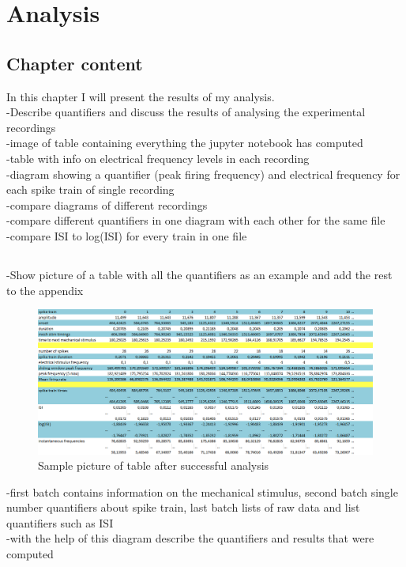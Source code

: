 \chapter{Analysis}

\section{Chapter content}
In this chapter I will present the results of my analysis.\\
-Describe quantifiers and discuss the results of analysing the experimental recordings\\
-image of table containing everything the jupyter notebook has computed\\
-table with info on electrical frequency levels in each recording\\
-diagram showing a quantifier (peak firing frequency) and electrical frequency for each spike train of single recording\\
-compare diagrams of different recordings\\
-compare different quantifiers in one diagram with each other for the same file\\
-compare ISI to log(ISI) for every train in one file\\

\section{}
-Show picture of a table with all the quantifiers as an example and add the rest to the appendix\\
\begin{figure}
	\includegraphics[width = \textwidth]{src/pic/sc_table}
	\caption{Sample picture of table after successful analysis }
	\label{fig:table_sc}
\end{figure}
-first batch contains information on the mechanical stimulus, second batch single number quantifiers about spike train, last batch lists of raw data and list quantifiers such as ISI\\
-with the help of this diagram describe the quantifiers and results that were computed\\


